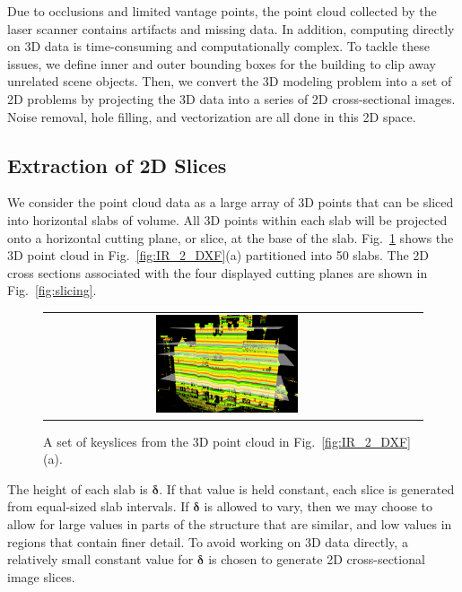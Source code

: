 \documentclass{acmsiggraph}                     %
\newcommand{\Fig}[1]{Fig.~\ref{fig:#1}}
\newcommand{\Figa}[1]{Fig.~\ref{fig:#1}(a)}
\begin{document}
Due to occlusions and limited vantage points, the point cloud collected by the
laser scanner contains artifacts and missing data.
In addition, computing directly on 3D data is time-consuming and
computationally complex.
To tackle these issues, we define inner and outer bounding boxes for the
building to clip away unrelated scene objects.
Then, we convert the 3D modeling problem into a set of 2D problems by
projecting the 3D data into a series of 2D cross-sectional images.
Noise removal, hole filling, and vectorization are all done in this
2D space.

\subsection{Extraction of 2D Slices}
\label{sec:image_slicing}
We consider the point cloud data as a large array of 3D points that can be
sliced into horizontal slabs of volume.
All 3D points within each slab will be projected onto a horizontal cutting
plane, or slice, at the base of the slab.
\Fig{slice_slab} shows the 3D point cloud in \Figa{IR_2_DXF} partitioned into 50 slabs.
The 2D cross sections associated with the four displayed cutting planes
are shown in \Fig{slicing}.

\begin{figure} [htbp]
\begin{center}
\begin{tabular}{cc}
\includegraphics[width=0.4\textwidth]{slab_planar.png}
\end{tabular}
\end{center}
\caption{A set of keyslices from the 3D point cloud in \Figa{IR_2_DXF}.}
\label{fig:slice_slab}
\end{figure}

The height of each slab is $\boldsymbol{\delta}$.
If that value is held constant, each slice is generated from equal-sized
slab intervals.
If $\boldsymbol{\delta}$ is allowed to vary, then we may
choose to allow for large values in parts of the structure that are similar,
and low values in regions that contain finer detail.
To avoid working on 3D data directly, a relatively small constant value
for $\boldsymbol{\delta}$ is chosen to generate 2D cross-sectional image slices.
\end{document}
